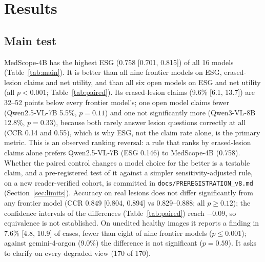 \documentclass[11pt]{article}
\begin{document}
\section{Results}

\subsection{Main test}\label{sec:main}
MedScope-4B has the highest ESG (0.758 [0.701, 0.815]) of all 16 models (Table~\ref{tab:main}). It is better than all nine frontier models on ESG, erased-lesion claims and net utility, and than all six open models on ESG and net utility (all $p<0.001$; Table~\ref{tab:paired}). Its erased-lesion claims (9.6\% [6.1, 13.7]) are 32--52 points below every frontier model's; one open model claims fewer (Qwen2.5-VL-7B 5.5\%, $p=0.11$) and one not significantly more (Qwen3-VL-8B 12.8\%, $p=0.33$), because both rarely answer lesion questions correctly at all (CCR 0.14 and 0.55), which is why ESG, not the claim rate alone, is the primary metric. This is an observed ranking reversal: a rule that ranks by erased-lesion claims alone prefers Qwen2.5-VL-7B (ESG 0.146) to MedScope-4B (0.758). Whether the paired control changes a model choice for the better is a testable claim, and a pre-registered test of it against a simpler sensitivity-adjusted rule, on a new reader-verified cohort, is committed in \texttt{docs/PREREGISTRATION\_v8.md} (Section~\ref{sec:limits}). Accuracy on real lesions does not differ significantly from any frontier model (CCR 0.849 [0.804, 0.894] vs 0.829--0.888; all $p\ge0.12$); the confidence intervals of the differences (Table~\ref{tab:paired}) reach $-0.09$, so equivalence is not established. On unedited healthy images it reports a finding in 7.6\% [4.8, 10.9] of cases, fewer than eight of nine frontier models ($p\le0.001$); against gemini-4-argon (9.0\%) the difference is not significant ($p=0.59$). It asks to clarify on every degraded view (170 of 170).
\end{document}
